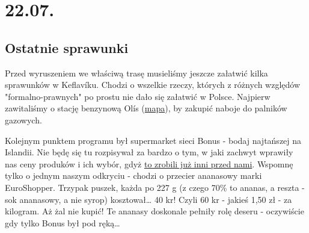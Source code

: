 \chapter*{22.07.}

\section{Ostatnie sprawunki}

\indent Przed wyruszeniem we właściwą trasę musieliśmy jeszcze załatwić kilka sprawunków w Keflavíku. Chodzi o wszelkie rzeczy, których z różnych względów "formalno-prawnych" po prostu nie dało się załatwić w Polsce.
Najpierw zawitaliśmy o stację benzynową Olís (\href{https://www.google.com/url?q=https\%3A\%2F\%2Fmaps.google.com\%2Fmaps\%3Fq\%3D63.979816\%2C-22.54672}{mapa}), by zakupić naboje do palników gazowych.



Kolejnym punktem programu był supermarket sieci Bonus - bodaj najtańszej na Islandii. Nie będę się tu rozpisywał za bardzo o tym, w jaki zachwyt wprawiły nas ceny produków i ich wybór, gdyż \href{http://www.roboppy.net/food/2009/04/iceland-day-1-part-ii-reykjavik-bonus-supermarket-skyr.html}{to zrobili już inni przed nami}. Wspomnę tylko o jednym naszym odkryciu - chodzi o przecier ananasowy marki EuroShopper. Trzypak puszek, każda po 227 g (z czego 70\% to ananas, a reszta - sok ananasowy, a nie syrop) kosztował… 40 kr! Czyli 60 kr - jakieś 1,50 zł - za kilogram. Aż żal nie kupić! Te ananasy doskonale pełniły rolę deseru - oczywiście gdy tylko Bonus był pod ręką…




